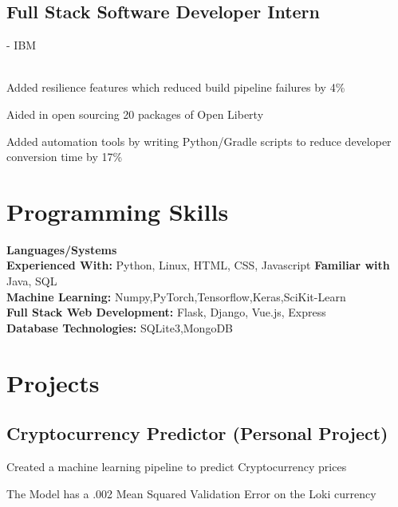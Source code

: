 \documentclass{resume}
\begin{document}
\subsection{Full Stack Software Developer Intern}- IBM \\
\\
\begin{tightemize}
	\item Added resilience features which reduced build pipeline failures by 4\%
	\item Aided in open sourcing 20 packages of Open Liberty
	\item Added automation tools by writing Python/Gradle scripts to reduce developer conversion time by 17\%
\end{tightemize}



\section{Programming Skills}

\fontsize{10.5pt}{12pt}\selectfont
\vspace{-1mm}
\textbf{Languages/Systems}\hspace{1mm} \\
\textbf{Experienced With:}\hspace{1mm} Python, Linux, HTML, CSS, Javascript\hspace{1.5mm} \textbf{Familiar with} Java, SQL\\
\textbf{Machine Learning:}\hspace{1mm} Numpy,PyTorch,Tensorflow,Keras,SciKit-Learn\\
\textbf{Full Stack Web Development:}\hspace{1mm} Flask, Django, Vue.js, Express\\
\textbf{Database Technologies:}\hspace{1mm} SQLite3,MongoDB\\
\section
{Projects}
\subsection{Cryptocurrency Predictor (Personal Project)}
\begin{tightemize}
    \item Created a machine learning pipeline to predict Cryptocurrency prices
    \item The Model has a .002 Mean Squared Validation Error on the Loki currency
\end{tightemize}
\end{document}
